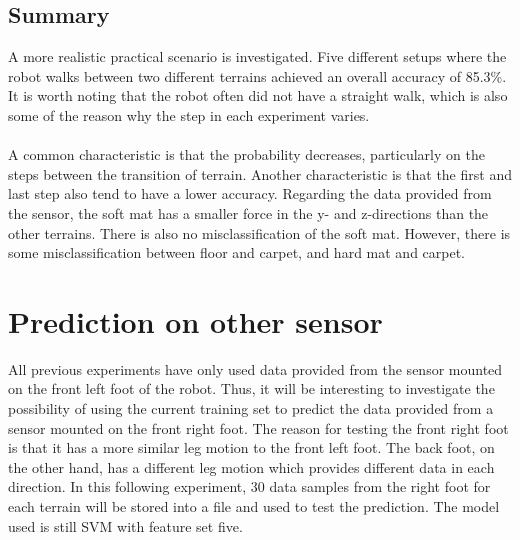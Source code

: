 \documentclass[USenglish]{ifimaster}  %
\begin{document}
\subsection{Summary}
A more realistic practical scenario is investigated. Five different setups where the robot walks between two different terrains achieved an overall accuracy of 85.3\%. It is worth noting that the robot often did not have a straight walk, which is also some of the reason why the step in each experiment varies. 
\\
\\
A common characteristic is that the probability decreases, particularly on the steps between the transition of terrain. Another characteristic is that the first and last step also tend to have a lower accuracy. Regarding the data provided from the sensor, the soft mat has a smaller force in the y- and z-directions than the other terrains. There is also no misclassification of the soft mat. However, there is some misclassification between floor and carpet, and hard mat and carpet.

\newpage
\section{Prediction on other sensor}
All previous experiments have only used data provided from the sensor mounted on the front left foot of the robot. Thus, it will be interesting to investigate the possibility of using the current training set to predict the data provided from a sensor mounted on the front right foot. The reason for testing the front right foot is that it has a more similar leg motion to the front left foot. The back foot, on the other hand, has a different leg motion which provides different data in each direction. In this following experiment, 30 data samples from the right foot for each terrain will be stored into a file and used to test the prediction. The model used is still SVM with feature set five.

	
\end{document}

